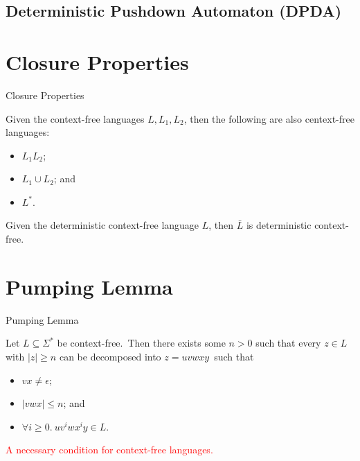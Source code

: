 \documentclass{beamer}
\def\r{\textcolor{red}}
\begin{document}
\subsection{Deterministic Pushdown Automaton (DPDA)}

\section{Closure Properties}

\begin{frame}{Closure Properties}
    \begin{theorem}
        Given the context-free languages $L, L_1, L_2$, then the following are also centext-free languages:\pause
        \begin{itemize}
            \item $L_1 L_2$\pause;
            \item $L_1 \cup L_2$\pause; and
            \item $L^*$.
        \end{itemize}
    \end{theorem}\pause

    \begin{theorem}
        Given the deterministic context-free language $L$, then $\bar{L}$ is deterministic context-free.
    \end{theorem}
\end{frame}

\section{Pumping Lemma}

\begin{frame}{Pumping Lemma}
    \begin{lemma}
        Let $L \subseteq \Sigma^*$ be context-free.\pause\ Then there exists some $n > 0$ such that every $z \in L$ with $|z| \geq n$ can be decomposed into $z = uvwxy$\pause\ such that
        \begin{itemize}
            \item $vx \neq \epsilon$\pause;
            \item $|vwx| \leq n$\pause; and
            \item $\forall i \geq 0.\ uv^iwx^iy \in L$.
        \end{itemize}
    \end{lemma}\pause
    \r{A necessary condition for context-free languages.}
\end{frame}
\end{document}
